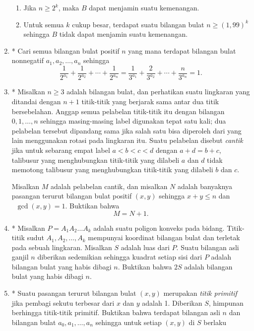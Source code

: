 \documentclass[12pt]{article}
\newcommand*\func[2]{\mathop{}\!{#1}{\left({#2}\right)}}
\begin{document}
\begin{enumerate}[leftmargin=*]
\begin{enumerate}
			\item Jika $ n \geq 2^{k} $, maka $ B $ dapat menjamin suatu kemenangan.
			\item Untuk semua $ k $ cukup besar, terdapat suatu bilangan bulat $ n \geq \left(1,99\right)^{k} $ sehingga $ B $ tidak dapat menjamin suatu kemenangan.
		\end{enumerate}
		\item* Cari semua bilangan bulat positif $ n $ yang mana terdapat bilangan bulat nonnegatif $ a_{1}, a_{2}, \dots, a_{n} $ sehingga
		\[ \frac{1}{2^{a_{1}}} + \frac{1}{2^{a_{2}}} + \cdots + \frac{1}{2^{a_{n}}} = \frac{1}{3^{a_{1}}} + \frac{2}{3^{a_{2}}} + \cdots + \frac{n}{3^{a_{n}}} = 1. \]
		\item* Misalkan $ n \geq 3 $ adalah bilangan bulat, dan perhatikan suatu lingkaran yang ditandai dengan $ n + 1 $ titik-titik yang berjarak sama antar dua titik bersebelahan. Anggap semua pelabelan titik-titik itu dengan bilangan $ 0, 1, \dots, n $ sehingga masing-masing label digunakan tepat satu kali; dua pelabelan tersebut dipandang sama jika salah satu bisa diperoleh dari yang lain menggunakan rotasi pada lingkaran itu. Suatu pelabelan disebut \textit{cantik} jika untuk sebarang empat label $ a < b < c < d $ dengan $ a + d = b + c $, talibusur yang menghubungkan titik-titik yang dilabeli $ a $ dan $ d $ tidak memotong talibusur yang menghubungkan titik-titik yang dilabeli $ b $ dan $ c $.
		\par \noindent Misalkan $ M $ adalah pelabelan cantik, dan misalkan $ N $ adalah banyaknya pasangan terurut bilangan bulat positif $ \left(x, y\right) $ sehingga $ x + y \leq n $ dan $ \func{\gcd}{x, y} = 1 $. Buktikan bahwa
		\[ M = N + 1. \]
		\item* Misalkan $ P = A_{1}A_{2} \dots A_{k} $ adalah suatu poligon konveks pada bidang. Titik-titik sudut $ A_{1}, A_{2}, \dots, A_{k} $ mempunyai koordinat bilangan bulat dan terletak pada sebuah lingkaran. Misalkan $ S $ adalah luas dari $ P $. Suatu bilangan asli ganjil $ n $ diberikan sedemikian sehingga kuadrat setiap sisi dari $ P $ adalah bilangan bulat yang habis dibagi $ n $. Buktikan bahwa $ 2S $ adalah bilangan bulat yang habis dibagi $ n $.
		\item* Suatu pasangan terurut bilangan bulat $ \left(x, y\right) $ merupakan \textit{titik primitif} jika pembagi sekutu terbesar dari $ x $ dan $ y $ adalah 1. Diberikan $ S $, himpunan berhingga titik-titik primitif. Buktikan bahwa terdapat bilangan asli $ n $ dan bilangan bulat $ a_{0}, a_{1}, \dots, a_{n} $ sehingga untuk setiap $ \left(x, y\right) $ di $ S $ berlaku

\end{enumerate}
\end{document}
